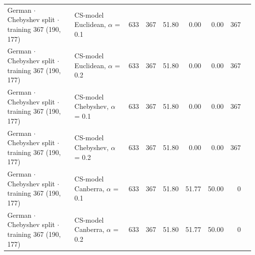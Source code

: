 \begin{longtable}{llrrrrrrl}
  German $\cdot$ Chebyshev split $\cdot$ training 367 (190, 177) & CS-model Euclidean, $\alpha$ = 0.1 & 633 & 367 & 51.80 & 0.00 & 0.00 & 367 &  \\
  German $\cdot$ Chebyshev split $\cdot$ training 367 (190, 177) & CS-model Euclidean, $\alpha$ = 0.2 & 633 & 367 & 51.80 & 0.00 & 0.00 & 367 &  \\
  German $\cdot$ Chebyshev split $\cdot$ training 367 (190, 177) & CS-model Chebyshev, $\alpha$ = 0.1 & 633 & 367 & 51.80 & 0.00 & 0.00 & 367 &  \\
  German $\cdot$ Chebyshev split $\cdot$ training 367 (190, 177) & CS-model Chebyshev, $\alpha$ = 0.2 & 633 & 367 & 51.80 & 0.00 & 0.00 & 367 &  \\
  German $\cdot$ Chebyshev split $\cdot$ training 367 (190, 177) & CS-model Canberra, $\alpha$ = 0.1 & 633 & 367 & 51.80 & 51.77 & 50.00 & 0 &  \\
  German $\cdot$ Chebyshev split $\cdot$ training 367 (190, 177) & CS-model Canberra, $\alpha$ = 0.2 & 633 & 367 & 51.80 & 51.77 & 50.00 & 0 &  \\
\end{longtable}
